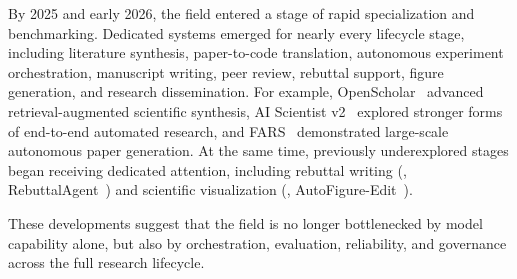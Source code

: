 By 2025 and early 2026, the field entered a stage of rapid specialization and benchmarking. Dedicated systems emerged for nearly every lifecycle stage, including literature synthesis, paper-to-code translation, autonomous experiment orchestration, manuscript writing, peer review, rebuttal support, figure generation, and research dissemination. For example, OpenScholar~\cite{openscholar2025} advanced retrieval-augmented scientific synthesis, AI Scientist v2~\cite{yamada2025aiscientistv2} explored stronger forms of end-to-end automated research, and FARS~\cite{fars2026_report} demonstrated large-scale autonomous paper generation. At the same time, previously underexplored stages began receiving dedicated attention, including rebuttal writing (\eg, RebuttalAgent~\cite{rebuttalagent2026}) and scientific visualization (\eg, AutoFigure-Edit~\cite{autofigure2026}). 

These developments suggest that the field is no longer bottlenecked by model capability alone, but also by orchestration, evaluation, reliability, and governance across the full research lifecycle.

